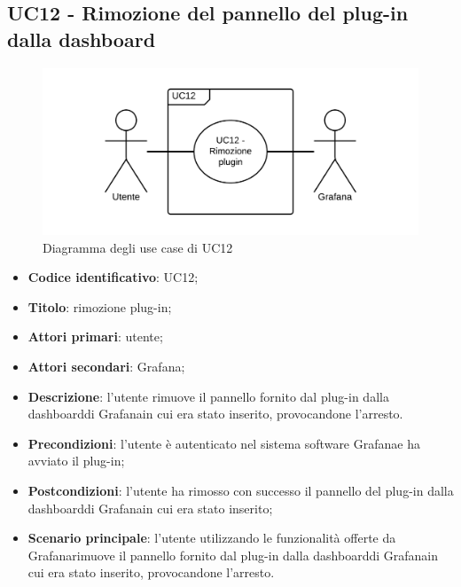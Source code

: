 \subsection{UC12 - Rimozione del pannello del plug-in dalla dashboard}
\begin{figure}[H]
\includegraphics{img/UC12_-_Rimozione_plugin.png}
\caption{Diagramma degli use case di UC12}
\end{figure}
\begin{itemize}
    \item \textbf{Codice identificativo}: UC12;
    \item \textbf{Titolo}: rimozione plug-in;
    \item \textbf{Attori primari}: utente;
    \item \textbf{Attori secondari}: Grafana\glo;
    \item \textbf{Descrizione}: l'utente rimuove il pannello fornito dal plug-in dalla dashboard\glosp di Grafana\glosp in cui era stato inserito, provocandone l'arresto.
    \item \textbf{Precondizioni}: l'utente è autenticato nel sistema software Grafana\glosp e ha avviato il plug-in;
    \item \textbf{Postcondizioni}: l'utente ha rimosso con successo il pannello del plug-in dalla dashboard\glosp di Grafana\glo in cui era stato inserito;
    \item \textbf{Scenario principale}: l'utente utilizzando le funzionalità offerte da Grafana\glosp rimuove il pannello fornito dal plug-in dalla dashboard\glosp di Grafana\glosp in cui era stato inserito, provocandone l'arresto.
\end{itemize}

